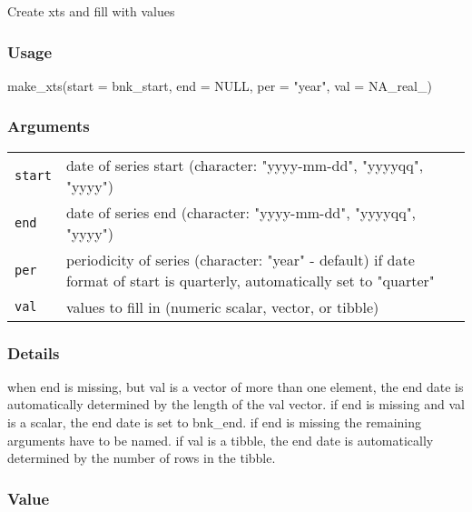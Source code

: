 \documentclass[
  letterpaper,
  DIV=11,
  numbers=noendperiod]{scrreport}
\newenvironment{Shaded}{\begin{snugshade}}{\end{snugshade}}
\newcommand{\AttributeTok}[1]{\textcolor[rgb]{0.40,0.45,0.13}{#1}}
\newcommand{\ConstantTok}[1]{\textcolor[rgb]{0.56,0.35,0.01}{#1}}
\newcommand{\FunctionTok}[1]{\textcolor[rgb]{0.28,0.35,0.67}{#1}}
\newcommand{\NormalTok}[1]{\textcolor[rgb]{0.00,0.23,0.31}{#1}}
\newcommand{\StringTok}[1]{\textcolor[rgb]{0.13,0.47,0.30}{#1}}
\begin{document}
Create xts and fill with values

\subsubsection{Usage}\label{usage-3}

\begin{Shaded}
\begin{Highlighting}[]
\FunctionTok{make\_xts}\NormalTok{(}\AttributeTok{start =}\NormalTok{ bnk\_start, }\AttributeTok{end =} \ConstantTok{NULL}\NormalTok{, }\AttributeTok{per =} \StringTok{"year"}\NormalTok{, }\AttributeTok{val =} \ConstantTok{NA\_real\_}\NormalTok{)}
\end{Highlighting}
\end{Shaded}

\subsubsection{Arguments}\label{arguments-3}

\begin{longtable}[]{@{}ll@{}}
\toprule\noalign{}
\endhead
\bottomrule\noalign{}
\endlastfoot
\texttt{start} & date of series start (character: "yyyy-mm-dd",
"yyyyqq", "yyyy") \\
\texttt{end} & date of series end (character: "yyyy-mm-dd", "yyyyqq",
"yyyy") \\
\texttt{per} & periodicity of series (character: "year" - default) if
date format of start is quarterly, automatically set to "quarter" \\
\texttt{val} & values to fill in (numeric scalar, vector, or tibble) \\
\end{longtable}

\subsubsection{Details}\label{details-3}

when end is missing, but val is a vector of more than one element, the
end date is automatically determined by the length of the val vector. if
end is missing and val is a scalar, the end date is set to bnk\_end. if
end is missing the remaining arguments have to be named. if val is a
tibble, the end date is automatically determined by the number of rows
in the tibble.

\subsubsection{Value}\label{value-3}
\end{document}
